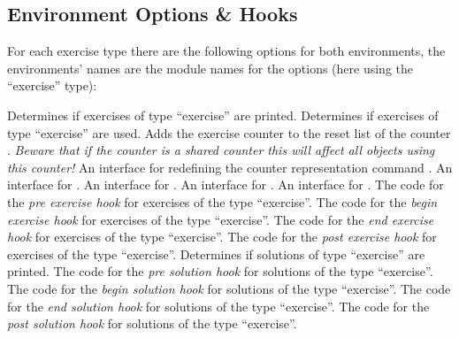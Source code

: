 \documentclass{xsim-manual}
\begin{document}
\subsection{Environment Options \& Hooks}\label{sec:environment-options-hooks}

For each exercise type there are the following options for both environments,
the environments' names are the module names for the options (here using the
\enquote{exercise} type):
\begin{options}
    Determines if exercises of type \enquote{exercise} are printed.
    Determines if exercises of type \enquote{exercise} are used.
  \Default
    Adds the exercise counter to the reset list of the counter
    .  \emph{Beware that if the counter is a shared counter
      this will affect \emph{all objects} using this counter!}
    An interface for redefining the counter representation command
    .
    An interface for %
    .
    An interface for %
    .
    An interface for %
    .
    An interface for %
    .
  \Default
    The code for the \emph{pre exercise hook} for exercises of the type
    \enquote{exercise}.
  \Default
    The code for the \emph{begin exercise hook} for exercises of the type
    \enquote{exercise}.
  \Default
    The code for the \emph{end exercise hook} for exercises of the type
    \enquote{exercise}.
  \Default
    The code for the \emph{post exercise hook} for exercises of the type
    \enquote{exercise}.
    Determines if solutions of type \enquote{exercise} are printed.
  \Default
    The code for the \emph{pre solution hook} for solutions of the type
    \enquote{exercise}.
  \Default
    The code for the \emph{begin solution hook} for solutions of the type
    \enquote{exercise}.
  \Default
    The code for the \emph{end solution hook} for solutions of the type
    \enquote{exercise}.
  \Default
    The code for the \emph{post solution hook} for solutions of the type
    \enquote{exercise}.
\end{options}
\end{document}
